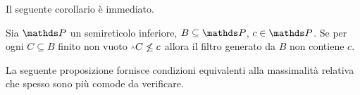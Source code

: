 Il seguente corollario \`e immediato.

\begin{corollary} \label{proppif}
Sia $\PP$ un semireticolo inferiore, $B\subseteq \PP$, $c\in \PP$. Se per ogni $C\subseteq B$ finito non vuoto $\swedge C\not\le c$ allora il filtro generato da $B$ non contiene $c$.\QED
\end{corollary}

La seguente proposizione fornisce condizioni equivalenti alla massimalit\`a relativa che spesso sono pi\`u comode da verificare.

\begin{comment}
\begin{proposition}\label{propmassimale}
Sia $\PP$ un semireticolo inferiore, $B\subseteq \PP$ e $c\in\PP$ tale che per ogni $C\subseteq B$ finito non vuoto $\swedge C \not\le c$. Le seguenti affermazioni sono equivalenti:
\begin{itemize}
\item[1.] $B$ \`e un filtro massimale relativo a $c$;
\item[2.] $a\notin B\ \ \IMP\ \ b\swedge a \le c$\ \  per qualche \ \ $b\in B$;
\item[3.] $a\notin B\ \ \IMP\ \ \swedge C\swedge a\le c$\ \ per qualche $C\subseteq B$ finito non vuoto.
\end{itemize}
\end{proposition}
\begin{proof}
Dimostriamo \ssf{1}\,$\IMP$\,\ssf{2}. Poich\'e $B$ \`e un filtro, quindi chiuso per intersezione, \ssf{2} afferma che se $a\notin B$ allora $\swedge C\not\le c$ per ogni insieme finito non vuoto $C\subseteq B\cup \{a\}$. Per il corollario~\ref{proppif}, questo equivale ad affermare che $B$ \`e un filtro massimale relativo a $c$. L'implicazione \ssf{2}\,$\IMP$\,\ssf{3} \`e ovvia. Per dimostrare \ssf{3}\,$\IMP$\,\ssf{1}, osserviamo per prima cosa che \ssf{3} implica che  $B$ \`e un filtro. Verifichiamo \ssf{f1}: sia $a\in B$ e $a\le b$. Se per assurdo $b\notin B$ allora da \ssf{3} otteniamo $\swedge C\swedge b\le c$ per qualche $C\subseteq B$ finito non vuoto. Da $a\le b$ otteniamo $\swedge C\swedge a\le c$. Ma $C\cup\{a\}\subseteq B$ in contraddizione con le ipotesi del lemma.  Verifichiamo \ssf{f2}: siano $a,b\in B$ e supponiamo che per assurdo $a\swedge  b\notin B$. Allora $ \swedge C\swedge a\swedge  b\le c$ per qualche $C\subseteq B$ finito non vuoto. Ma $C\cup\{a,b\}\subseteq B$ in contraddizione con le ipotesi del lemma. Infine per dimostrare la massimalit\`a osserviamo che se $H$ \`e un filtro tale che $B\subset H$ e $c\notin H$, allora un qualunque $a\in H\sm B$ contraddice \ssf{3}.
\end{proof}


\end{comment}
